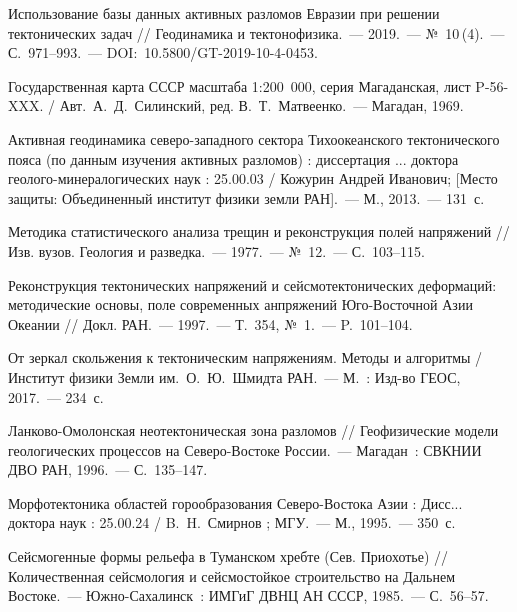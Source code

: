 \begin{thebibliography}{99}
\bibitem{} Использование базы данных активных разломов Евразии при решении тектонических задач // Геодинамика и тектонофизика.~--- 2019.~--- №~10\,(4).~--- С.~971--993.~--- DOI:~10.5800/GT-2019-10-4-0453.

\bibitem{}Государственная карта СССР масштаба 1:200 000, серия Магаданская, лист P-56-XXX. / Авт.~А.~Д.~Силинский, ред. В.~Т.~Матвеенко.~--- Магадан, 1969.

\bibitem{} Активная геодинамика северо-западного сектора Тихоокеанского тектонического пояса (по данным изучения активных разломов) : диссертация ... доктора геолого-минералогических наук : 25.00.03 / Кожурин Андрей Иванович; [Место защиты: Объединенный институт физики земли РАН].~--- М., 2013.~--- 131~с.

\bibitem{} Методика статистического анализа трещин и реконструкция полей напряжений // Изв. вузов. Геология и разведка.~--- 1977.~--- №~12.~--- С.~103--115.

\bibitem{} Реконструкция тектонических напряжений и сейсмотектонических деформаций: методические основы, поле современных анпряжений Юго-Восточной Азии Океании // Докл. РАН.~--- 1997.~--- Т.~354, №~1.~--- P.~101--104.

\bibitem{} От зеркал скольжения к тектоническим напряжениям. Методы и алгоритмы / Институт физики Земли им.~О.~Ю.~Шмидта РАН.~--- М.~: Изд-во ГЕОС, 2017.~--- 234~с.

\bibitem{} Ланково-Омолонская неотектоническая зона разломов // Геофизические модели геологических процессов на Северо-Востоке России.~--- Магадан~: СВКНИИ ДВО РАН, 1996.~--- С.~135--147.

\bibitem{} Морфотектоника областей горообразования Северо-Востока Азии : Дисс... доктора наук : 25.00.24 / B.~H.~Смирнов ; МГУ.~--- М., 1995.~--- 350~с.

\bibitem{} Сейсмогенные формы рельефа в Туманском хребте (Сев. Приохотье) // Количественная сейсмология  и  сейсмостойкое  строительство  на  Дальнем  Востоке.~--- Южно-Сахалинск~: ИМГиГ ДВНЦ АН СССР, 1985.~--- С.~56--57.
\end{thebibliography}
